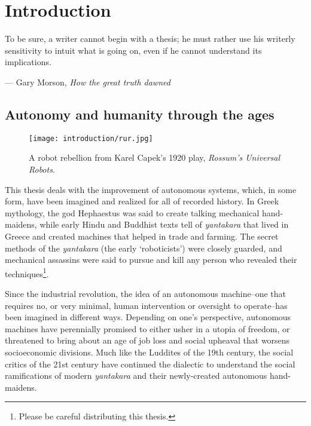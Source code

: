 \chapter{Introduction}
\epigraph{To be sure, a writer cannot begin with a thesis; he must rather use his writerly sensitivity to intuit what is going on, even if he cannot understand its implications.}{--- Gary Morson, \textit{How the great truth dawned}}

 

\section{Autonomy and humanity through the ages}
\begin{wrapfigure}{r}{0.5\textwidth}
  \begin{center}
  	\vspace{-20pt}
    \texttt{[image: introduction/rur.jpg]}
     \vspace{-15pt}
  \end{center}
  \caption{A robot rebellion from Karel Capek's 1920 play, \textit{Rossum's Universal Robots}.}
  \vspace{-5pt}
  \label{fig:into_rur}
\end{wrapfigure}

This thesis deals with the improvement of autonomous systems, which, in some form, have been imagined and realized for all of recorded history. In Greek mythology, the god Hephaestus was said to create talking mechanical hand-maidens, while early Hindu and Buddhist texts tell of \textit{yantakara} that lived in Greece and created machines that helped in trade and farming. The secret methods of the \textit{yantakara} (the early `roboticists') were closely guarded, and mechanical assassins were said to pursue and kill any person who revealed their techniques\footnote{Please be careful distributing this thesis.}. 



Since the industrial revolution, the idea of an autonomous machine--one that requires no, or very minimal, human intervention or oversight to operate--has been imagined in different ways. Depending on one's perspective, autonomous machines have perennially promised to either usher in a utopia of freedom, or threatened to bring about an age of job loss and social upheaval that worsens socioeconomic divisions. Much like the Luddites of the 19th century, the social critics of the 21st century have continued the dialectic to understand the social ramifications of modern \textit{yantakara} and their newly-created autonomous hand-maidens.

